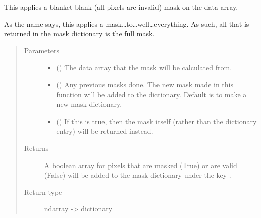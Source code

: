 \documentclass[letterpaper,10pt,english]{sphinxmanual}
\begin{document}

\begin{fulllineitems}
\label{\detokenize{python_docstrings/IfA_Smeargle.echo.masks.masks_echo300:IfA_Smeargle.echo.masks.masks_echo300.echo399_everything}}
This applies a blanket blank (all pixels are invalid) mask on the data array.

As the name says, this applies a mask…to…well…everything. As such, all that is
returned in the mask dictionary is the full mask.
\begin{quote}\begin{description}
\item[{Parameters}] \leavevmode\begin{itemize}
\item {} 
 () \textendash{} The data array that the mask will be calculated from.

\item {} 
 (\sphinxstyleliteralemphasis{\sphinxupquote{ (}}\sphinxstyleliteralemphasis{\sphinxupquote{)}}) \textendash{} Any previous masks done. The new mask made in this function will be added to the
dictionary. Default is to make a new mask dictionary.

\item {} 
 (\sphinxstyleliteralemphasis{\sphinxupquote{ (}}\sphinxstyleliteralemphasis{\sphinxupquote{)}}) \textendash{} If this is true, then the mask itself (rather than the dictionary entry) will be
returned instead.

\end{itemize}

\item[{Returns}] \leavevmode
{} \textendash{} A boolean array for pixels that are masked (True) or are valid (False) will be added to
the mask dictionary under the key .

\item[{Return type}] \leavevmode
ndarray -\textgreater{} dictionary

\end{description}\end{quote}

\end{fulllineitems}
\end{document}
